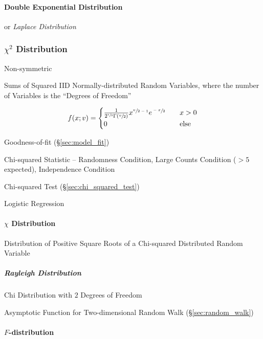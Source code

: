 \paragraph{Double Exponential Distribution}\label{sec:double_exponential}\hfill

or \emph{Laplace Distribution}



\subsubsection{$\chi^2$ Distribution}\label{sec:chi_squared}

Non-symmetric

Sums of Squared IID Normally-distributed Random Variables, where the number of
Variables is the ``Degrees of Freedom''

\[
  f(x; v) =
  \begin{cases}
    \frac{1}{2^{\sfrac{v}{2}}\Gamma(\sfrac{v}{2})}
      x^{\sfrac{v}{2-1}} e^{\sfrac{-x}{2}}
          & \quad x > 0 \\
    0     & \quad\text{else} \\
  \end{cases}
\]

Goodness-of-fit (\S\ref{sec:model_fit})

Chi-squared Statistic -- Randomness Condition, Large Counts Condition ($>5$
expected), Independence Condition

\fist Chi-squared Test (\S\ref{sec:chi_squared_test})

Logistic Regression



\paragraph{$\chi$ Distribution}\label{sec:chi_distribution}\hfill

Distribution of Positive Square Roots of a Chi-squared Distributed Random
Variable



\subparagraph{Rayleigh Distribution}\label{sec:rayleigh_distribution}\hfill

Chi Distribution with $2$ Degrees of Freedom

Asymptotic Function for Two-dimensional Random Walk (\S\ref{sec:random_walk})



\paragraph{$F$-distribution}\label{sec:f_distribution}\hfill

